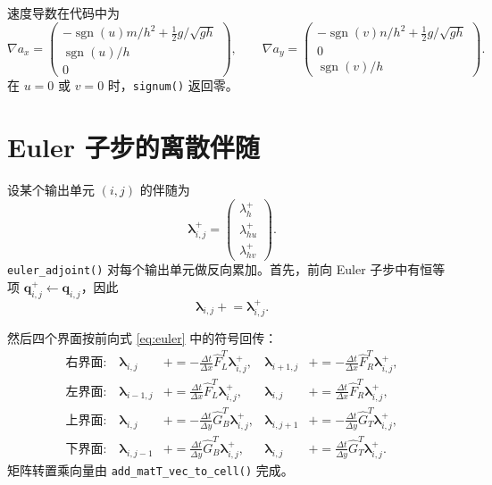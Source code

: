 \documentclass[12pt,a4paper]{article}
\begin{document}
速度导数在代码中为
\begin{equation}
\nabla a_x =
\begin{pmatrix}
-\operatorname{sgn}(u)m/h^2+\frac12 g/\sqrt{gh}\\
\operatorname{sgn}(u)/h\\
0
\end{pmatrix},
\qquad
\nabla a_y =
\begin{pmatrix}
-\operatorname{sgn}(v)n/h^2+\frac12 g/\sqrt{gh}\\
0\\
\operatorname{sgn}(v)/h
\end{pmatrix}.
\label{eq:wavespeed-grad}
\end{equation}
在 $u=0$ 或 $v=0$ 时，\texttt{signum()} 返回零。

\section{Euler 子步的离散伴随}

设某个输出单元 $(i,j)$ 的伴随为
\[
\bm{\lambda}_{i,j}^{+}
=
\begin{pmatrix}
\lambda_h^+\\
\lambda_{hu}^+\\
\lambda_{hv}^+
\end{pmatrix}.
\]
\texttt{euler\_adjoint()} 对每个输出单元做反向累加。首先，前向 Euler
子步中有恒等项 $\mathbf{q}_{i,j}^{+}\leftarrow\mathbf{q}_{i,j}$，因此
\[
\bm{\lambda}_{i,j}\mathrel{+}= \bm{\lambda}_{i,j}^{+}.
\]

然后四个界面按前向式 \eqref{eq:euler} 中的符号回传：
\begin{align}
\text{右界面:}\quad
\bm{\lambda}_{i,j}   &\mathrel{+}= -\frac{\Delta t}{\Delta x}\widehat{F}_L^T\bm{\lambda}_{i,j}^{+},
&
\bm{\lambda}_{i+1,j} &\mathrel{+}= -\frac{\Delta t}{\Delta x}\widehat{F}_R^T\bm{\lambda}_{i,j}^{+},
\label{eq:adj-right}\\
\text{左界面:}\quad
\bm{\lambda}_{i-1,j} &\mathrel{+}=  \frac{\Delta t}{\Delta x}\widehat{F}_L^T\bm{\lambda}_{i,j}^{+},
&
\bm{\lambda}_{i,j}   &\mathrel{+}=  \frac{\Delta t}{\Delta x}\widehat{F}_R^T\bm{\lambda}_{i,j}^{+},
\label{eq:adj-left}\\
\text{上界面:}\quad
\bm{\lambda}_{i,j}   &\mathrel{+}= -\frac{\Delta t}{\Delta y}\widehat{G}_B^T\bm{\lambda}_{i,j}^{+},
&
\bm{\lambda}_{i,j+1} &\mathrel{+}= -\frac{\Delta t}{\Delta y}\widehat{G}_T^T\bm{\lambda}_{i,j}^{+},
\label{eq:adj-top}\\
\text{下界面:}\quad
\bm{\lambda}_{i,j-1} &\mathrel{+}=  \frac{\Delta t}{\Delta y}\widehat{G}_B^T\bm{\lambda}_{i,j}^{+},
&
\bm{\lambda}_{i,j}   &\mathrel{+}=  \frac{\Delta t}{\Delta y}\widehat{G}_T^T\bm{\lambda}_{i,j}^{+}.
\label{eq:adj-bottom}
\end{align}
矩阵转置乘向量由 \texttt{add\_matT\_vec\_to\_cell()} 完成。
\end{document}
